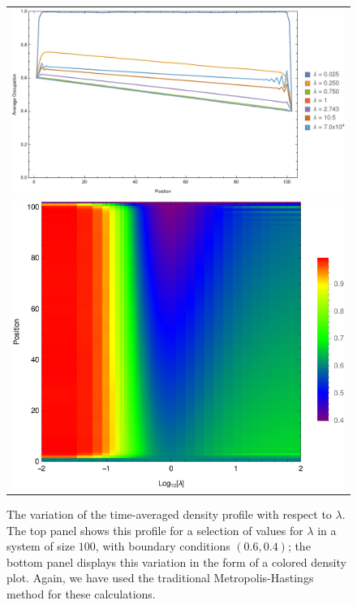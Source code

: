 \documentclass[
reprint, amsmath,amssymb,
]{revtex4-1}
\begin{document}
\begin{figure}[h!]
\vspace{0em}
\begin{center}
 \begin{tabular}{c}
    \includegraphics[width=1\linewidth]{densityInstances} \\
    \includegraphics[width=1\linewidth]{graemeDensityProfile.pdf}
 \end{tabular}
\end{center}
    \vspace{-0em}
\caption{\label{fig:densProfiles}  The variation of the time-averaged density profile with respect to $\lambda$. The top panel shows this profile for a selection of values for
  $\lambda$ in a system of size $100$, with boundary conditions $(0.6, 0.4)$; the bottom panel displays this variation in the form of a colored density plot.
  Again, we have used the traditional Metropolis-Hastings method for these calculations. }
\end{figure}
\end{document}
